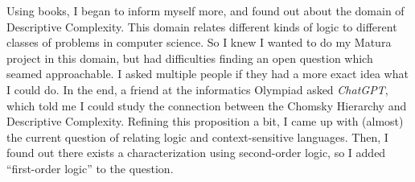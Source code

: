 Using books, I began to inform myself more, and found out about the domain of Descriptive Complexity.
This domain relates different kinds of logic to different classes of problems in computer science.
So I knew I wanted to do my Matura project in this domain, but had difficulties finding an open question which seamed approachable.
I asked multiple people if they had a more exact idea what I could do.
In the end, a friend at the informatics Olympiad asked \emph{ChatGPT}, which told me I could study the connection between the Chomsky Hierarchy and Descriptive Complexity.
Refining this proposition a bit, I came up with (almost) the current question of relating logic and context-sensitive languages.
Then, I found out there exists a characterization using second-order logic, so I added ``first-order logic'' to the question.
